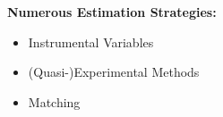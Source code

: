 \begin{frame}
	\textbf{Numerous Estimation Strategies:}
	\begin{itemize}\setlength\itemsep{1em}
		\item Instrumental Variables
		\item (Quasi-)Experimental Methods
		\item Matching
	\end{itemize}  
\end{frame}